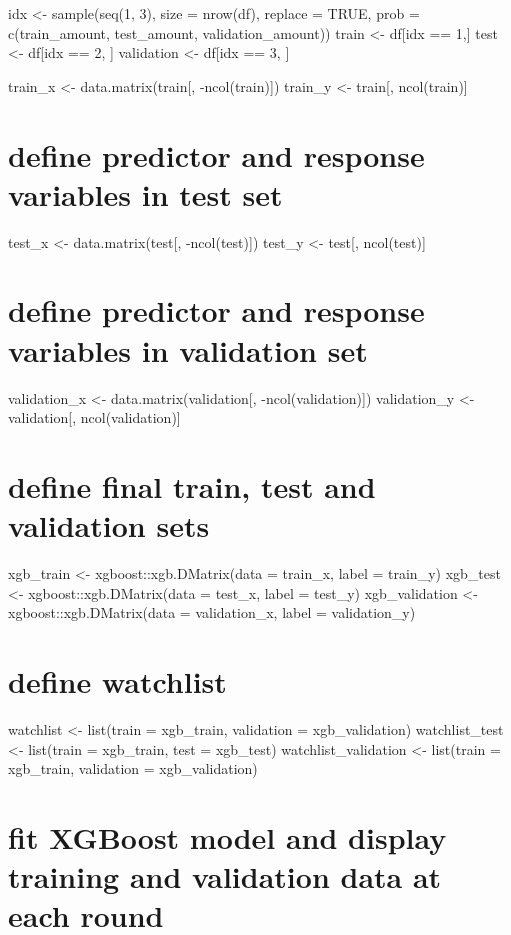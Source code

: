 \documentclass[
]{book}
\begin{document}
idx \textless- sample(seq(1, 3), size = nrow(df), replace = TRUE, prob =
c(train\_amount, test\_amount, validation\_amount)) train \textless- df{[}idx == 1,{]} test \textless- df{[}idx == 2, {]} validation \textless- df{[}idx == 3, {]}

train\_x \textless- data.matrix(train{[}, -ncol(train){]}) train\_y \textless- train{[},
ncol(train){]}

\chapter{define predictor and response variables in test set}\label{define-predictor-and-response-variables-in-test-set}

test\_x \textless- data.matrix(test{[}, -ncol(test){]}) test\_y \textless- test{[},
ncol(test){]}

\chapter{define predictor and response variables in validation set}\label{define-predictor-and-response-variables-in-validation-set}

validation\_x \textless- data.matrix(validation{[}, -ncol(validation){]})
validation\_y \textless- validation{[}, ncol(validation){]}

\chapter{define final train, test and validation sets}\label{define-final-train-test-and-validation-sets}

xgb\_train \textless- xgboost::xgb.DMatrix(data = train\_x, label = train\_y)
xgb\_test \textless- xgboost::xgb.DMatrix(data = test\_x, label = test\_y)
xgb\_validation \textless- xgboost::xgb.DMatrix(data = validation\_x, label =
validation\_y)

\chapter{define watchlist}\label{define-watchlist}

watchlist \textless- list(train = xgb\_train, validation = xgb\_validation)
watchlist\_test \textless- list(train = xgb\_train, test = xgb\_test)
watchlist\_validation \textless- list(train = xgb\_train, validation =
xgb\_validation)

\chapter{fit XGBoost model and display training and validation data at each round}\label{fit-xgboost-model-and-display-training-and-validation-data-at-each-round}
\end{document}
